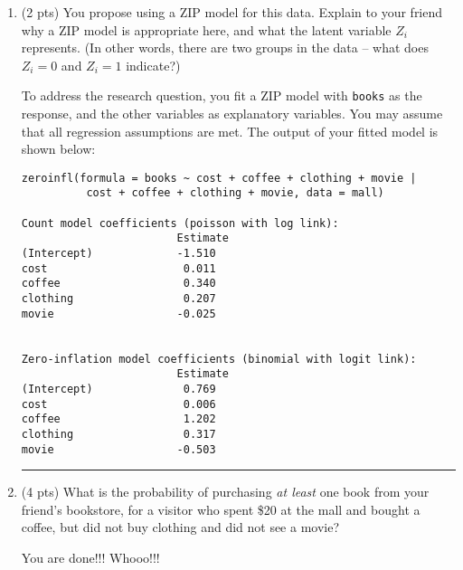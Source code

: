 \documentclass[11pt]{article}
\begin{document}
\begin{enumerate}
\rule{\textwidth}{1pt}

\item (2 pts) You propose using a ZIP model for this data. Explain to your friend why a ZIP model is appropriate here, and what the latent variable $Z_i$ represents. (In other words, there are two groups in the data -- what does $Z_i = 0$ and $Z_i = 1$ indicate?)

\newpage

To address the research question, you fit a ZIP model with \verb;books; as the response, and the other variables as explanatory variables. You may assume that all regression assumptions are met. The output of your fitted model is shown below:

\begin{verbatim}
zeroinfl(formula = books ~ cost + coffee + clothing + movie | 
          cost + coffee + clothing + movie, data = mall)

Count model coefficients (poisson with log link):
                        Estimate
(Intercept)             -1.510
cost                     0.011
coffee                   0.340
clothing                 0.207
movie                   -0.025


Zero-inflation model coefficients (binomial with logit link):
                        Estimate
(Intercept)              0.769
cost                     0.006
coffee                   1.202
clothing                 0.317
movie                   -0.503

\end{verbatim}

\rule{\textwidth}{1pt}

\item (4 pts) What is the probability of purchasing \textit{at least} one book from your friend's bookstore, for a visitor who spent \$20 at the mall and bought a coffee, but did not buy clothing and did not see a movie?

\newpage



\huge{You are done!!! Whooo!!!}




\end{enumerate}


\end{document}
